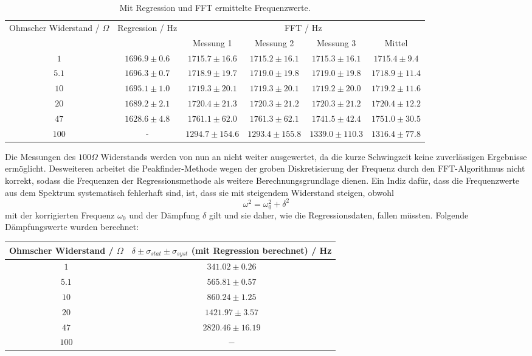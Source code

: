 \documentclass[a4paper, 12pt]{scrartcl}
\begin{document}
\begin{table}[H]
\centering
\begin{adjustbox}{width=\textwidth}
\begin{tabular}{c|c|cccc}
\multirow{2}{*}{Ohmscher Widerstand / $\Omega$} & \multirow{2}{*}{Regression / Hz} & \multicolumn{4}{c}{FFT / Hz} \\
\cline{3-6}
& & Messung 1 & Messung 2 & Messung 3 & Mittel\\
\hline
$1$ & $1696.9 \pm 0.6$ & $1715.7\pm 16.6$ & $1715.2\pm 16.1$ & $1715.3\pm 16.1$ & $1715.4\pm 9.4$\\
$5.1$ & $1696.3 \pm 0.7$ & $1718.9\pm 19.7$ & $1719.0\pm 19.8$ & $1719.0\pm 19.8$ & $1718.9\pm 11.4$\\
$10$ & $1695.1 \pm 1.0$ & $1719.3\pm 20.1$ & $1719.3\pm 20.1$ & $1719.2\pm 20.0$ & $1719.2\pm 11.6$ \\
$20$ & $1689.2 \pm 2.1$ & $1720.4\pm 21.3$ & $1720.3\pm 21.2$ & $1720.3\pm 21.2$ & $1720.4\pm 12.2$\\
$47$ & $1628.6 \pm 4.8$ & $1761.1\pm 62.0$ & $1761.3\pm 62.1$ & $1741.5\pm 42.4$ & $1751.0 \pm 30.5$\\
$100$ & - & $1294.7\pm 154.6$ & $1293.4\pm 155.8$ & $1339.0\pm 110.3$ & $1316.4 \pm 77.8$
\end{tabular}
\end{adjustbox}
\caption{Mit Regression und FFT ermittelte Frequenzwerte.}
\label{tab:freq}
\end{table}

Die Messungen des $100\Omega$ Widerstands werden von nun an nicht weiter ausgewertet, da die kurze Schwingzeit keine zuverlässigen Ergebnisse ermöglicht. Desweiteren arbeitet die Peakfinder-Methode wegen der groben Diskretisierung der Frequenz durch den FFT-Algorithmus nicht korrekt, sodass die Frequenzen der Regressionsmethode als weitere Berechnungsgrundlage dienen. Ein Indiz dafür, dass die Frequenzwerte aus dem Spektrum systematisch fehlerhaft sind, ist, dass sie mit steigendem Widerstand steigen, obwohl
$$\omega^2 = \omega_0^2 + \delta^2$$
mit der korrigierten Frequenz $\omega_0$ und der Dämpfung $\delta$ gilt und sie daher, wie die Regressionsdaten, fallen müssten. Folgende Dämpfungswerte wurden berechnet:

\begin{table}[H]
\centering
\begin{tabular}{c|c}
Ohmscher Widerstand / $\Omega$ & $\delta \pm \sigma_{stat} \pm \sigma_{syst}$ (mit Regression berechnet) / Hz \\
\hline
$1$ & $341.02 \pm 0.26$ \\
$5.1$ & $565.81 \pm 0.57$\\
$10$ & $860.24 \pm 1.25$ \\
$20$ & $1421.97 \pm 3.57$ \\
$47$ & $2820.46 \pm 16.19$\\
$100$ & $-$
\end{tabular}
\end{table}
\end{document}
